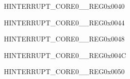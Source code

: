 \begin{register}{H}{INTERRUPT\_CORE0\_\_REG}{0x0040}\label{regdesc:INTERRUPTCORE0SPIINTR2MAPREG}






\end{register}\vspace{-3em}










\begin{register}{H}{INTERRUPT\_CORE0\_\_REG}{0x0044}\label{regdesc:INTERRUPTCORE0UARTINTRMAPREG}






\end{register}\vspace{-3em}


\begin{register}{H}{INTERRUPT\_CORE0\_\_REG}{0x0048}\label{regdesc:INTERRUPTCORE0UART1INTRMAPREG}






\end{register}\vspace{-3em}


\begin{register}{H}{INTERRUPT\_CORE0\_\_REG}{0x004C}\label{regdesc:INTERRUPTCORE0LEDCINTMAPREG}






\end{register}\vspace{-3em}


\begin{register}{H}{INTERRUPT\_CORE0\_\_REG}{0x0050}\label{regdesc:INTERRUPTCORE0EFUSEINTMAPREG}






\end{register}\vspace{-3em}


















